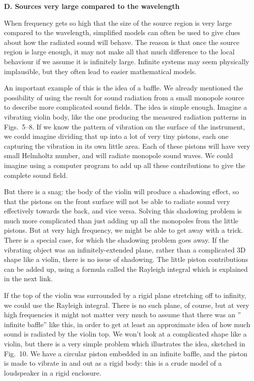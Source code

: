   \textbf{D. Sources very large compared to the wavelength} 

  When frequency gets so high that the size of the source region is very large 
  compared to the wavelength, simplified models can often be used to give clues 
  about how the radiated sound will behave. The reason is that once the source 
  region is large enough, it may not make all that much difference to the local 
  behaviour if we assume it is infinitely large. Infinite systems may seem 
  physically implausible, but they often lead to easier mathematical models. 

  An important example of this is the idea of a baffle. We already mentioned 
  the possibility of using the result for sound radiation from a small monopole 
  source to describe more complicated sound fields. The idea is simple enough. 
  Imagine a vibrating violin body, like the one producing the measured 
  radiation patterns in Figs.\ 5--8. If we know the pattern of vibration on the 
  surface of the instrument, we could imagine dividing that up into a lot of 
  very tiny pistons, each one capturing the vibration in its own little area. 
  Each of these pistons will have very small Helmholtz number, and will radiate 
  monopole sound waves. We could imagine using a computer program to add up all 
  these contributions to give the complete sound field. 

  But there is a snag: the body of the violin will produce a shadowing effect, 
  so that the pistons on the front surface will not be able to radiate sound 
  very effectively towards the back, and vice versa. Solving this shadowing 
  problem is much more complicated than just adding up all the monopoles from 
  the little pistons. But at very high frequency, we might be able to get away 
  with a trick. There is a special case, for which the shadowing problem goes 
  away. If the vibrating object was an infinitely-extended plane, rather than a 
  complicated 3D shape like a violin, there is no issue of shadowing. The 
  little piston contributions can be added up, using a formula called the 
  Rayleigh integral which is explained in the next link. 

  If the top of the violin was surrounded by a rigid plane stretching off to 
  infinity, we could use the Rayleigh integral. There is no such plane, of 
  course, but at very high frequencies it might not matter very much to assume 
  that there was an '' infinite baffle'' like this, in order to get at least an 
  approximate idea of how much sound is radiated by the violin top. We won't 
  look at a complicated shape like a violin, but there is a very simple problem 
  which illustrates the idea, sketched in Fig.\ 10. We have a circular piston 
  embedded in an infinite baffle, and the piston is made to vibrate in and out 
  as a rigid body: this is a crude model of a loudspeaker in a rigid enclosure. 

